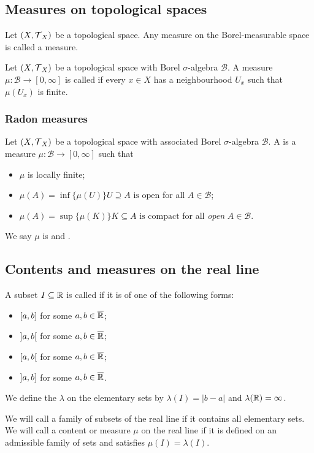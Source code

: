 \subsection{Measures on topological spaces}
\begin{definition}
Let $\left( X, \operatorname{\mathcal{T}}_X \right)$ be a topological space. Any measure on the Borel-measurable space is called a  measure. 
\end{definition}


\begin{definition}
Let $\left( X, \operatorname{\mathcal{T}}_X \right)$ be a topological space with Borel $\sigma$-algebra $\mathcal{B}$. A measure $\mu: \mathcal{B} \to [0,\infty]$ is called  if every $x\in X$ has a neighbourhood $U_x$ such that $\mu(U_x)$ is finite.
\end{definition}

\subsubsection{Radon measures}
\begin{definition}
Let $\left( X, \operatorname{\mathcal{T}}_X \right)$ be a topological space with associated Borel $\sigma$-algebra $\mathcal{B}$. A  is a measure $\mu: \mathcal{B}\to [0,\infty]$ such that
\begin{itemize}
\item $\mu$ is locally finite;
\item $\mu(A) = \inf\{\mu(U)\}{\text{$U\supseteq A$ is open}}$ for all $A\in \mathcal{B}$;
\item $\mu(A) = \sup\{\mu(K)\}{\text{$K\subseteq A$ is compact}}$ for all \emph{open} $A\in \mathcal{B}$.
\end{itemize}
We say $\mu$ is  and .
\end{definition}


\subsection{Contents and measures on the real line}
\begin{definition}
A subset $I\subseteq \mathbb{R}$ is called  if it is of one of the following forms:
\begin{itemize}
\item $\interval[c]{a,b}$ for some $a,b\in \overline{\mathbb{R}}$;
\item $\interval[o]{a,b}$ for some $a,b\in \overline{\mathbb{R}}$;
\item $\interval[co]{a,b}$ for some $a,b\in \overline{\mathbb{R}}$;
\item $\interval[oc]{a,b}$ for some $a,b\in \overline{\mathbb{R}}$.
\end{itemize}
We define the  $\lambda$ on the elementary sets by $\lambda(I) = |b-a|$ and $\lambda(\mathbb{R}) = \infty$.

We will call a family of subsets of the real line  if it contains all elementary sets. We will call a content or measure $\mu$ on the real line  if it is defined on an admissible family of sets and satisfies $\mu(I) = \lambda(I)$.
\end{definition}

